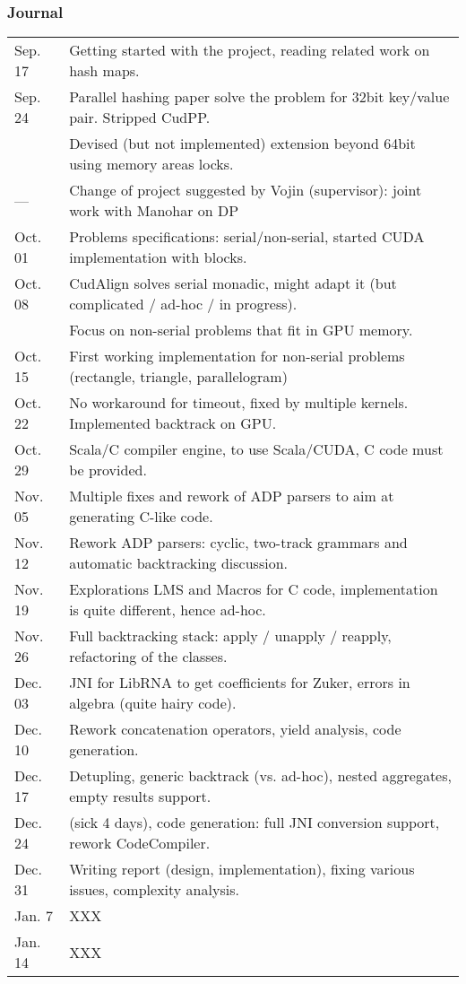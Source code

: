 \documentclass[11pt]{article}
\begin{document}
\subsubsection*{Journal}
\begin{tabular}{ll}
Sep. 17	& Getting started with the project, reading related work on hash maps. \\
Sep. 24	& Parallel hashing paper solve the problem for 32bit key/value pair. Stripped CudPP. \\
		& Devised (but not implemented) extension beyond 64bit using memory areas locks. \\
---		& Change of project suggested by Vojin (supervisor): joint work with Manohar on DP \\
Oct. 01	& Problems specifications: serial/non-serial, started CUDA implementation with blocks. \\
Oct. 08	& CudAlign solves serial monadic, might adapt it (but complicated / ad-hoc / in progress). \\
		& Focus on non-serial problems that fit in GPU memory. \\
Oct. 15	& First working implementation for non-serial problems (rectangle, triangle, parallelogram) \\
Oct. 22	& No workaround for timeout, fixed by multiple kernels. Implemented backtrack on GPU. \\
Oct. 29	& Scala/C compiler engine, to use Scala/CUDA, C code must be provided. \\
Nov. 05	& Multiple fixes and rework of ADP parsers to aim at generating C-like code. \\
Nov. 12	& Rework ADP parsers: cyclic, two-track grammars and automatic backtracking discussion. \\
Nov. 19	& Explorations LMS and Macros for C code, implementation is quite different, hence ad-hoc. \\
Nov. 26	& Full backtracking stack: apply / unapply / reapply, refactoring of the classes. \\
Dec. 03	& JNI for LibRNA to get coefficients for Zuker, errors in algebra (quite hairy code). \\
Dec. 10	& Rework concatenation operators, yield analysis, code generation. \\
Dec. 17	& Detupling, generic backtrack (vs. ad-hoc), nested aggregates, empty results support. \\
Dec. 24	& (sick 4 days), code generation: full JNI conversion support, rework CodeCompiler. \\
Dec. 31	& Writing report (design, implementation), fixing various issues, complexity analysis. \\
Jan. 7	& {\color{red} XXX} \\
Jan. 14	& {\color{red} XXX} \\
\end{tabular}
\end{document}
